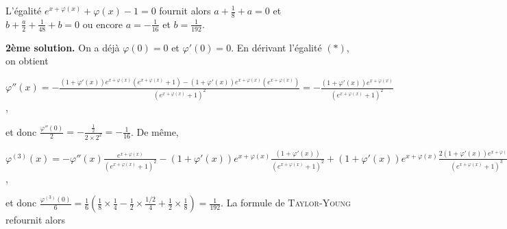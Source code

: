 {{L'égalité $e^{x+\varphi(x)}+\varphi(x)-1=0$ fournit alors $a+ \frac{1}{8}+a=0$ et $b+ \frac{a}{2}+ \frac{1}{48}+b=0$ ou encore $a=- \frac{1}{16}$ et $b= \frac{1}{192}$.

\textbf{2ème solution.} On a déjà $\varphi(0)=0$ et $\varphi'(0)=0$. En dérivant l'égalité $(*)$, on obtient

\begin{center}
$\varphi''(x)=- \frac{(1+\varphi'(x))e^{x+\varphi(x)}(e^{x+\varphi(x)}+1)-(1+\varphi'(x))e^{x+\varphi(x)}(e^{x+\varphi(x)})}{\left(e^{x+\varphi(x)}+1\right)^2}=- \frac{(1+\varphi'(x))e^{x+\varphi(x)}}{\left(e^{x+\varphi(x)}+1\right)^2}$,
\end{center}

et donc $ \frac{\varphi''(0)}{2}=- \frac{ \frac{1}{2}}{2\times2^2}=- \frac{1}{16}$. De même,

\begin{center}
$\varphi^{(3)}(x)=-\varphi''(x) \frac{e^{x+\varphi(x)}}{\left(e^{x+\varphi(x)}+1\right)^2}-(1+\varphi'(x))e^{x+\varphi(x)} \frac{(1+\varphi'(x))}{\left(e^{x+\varphi(x)}+1\right)^2}+(1+\varphi'(x))e^{x+\varphi(x)} \frac{2(1+\varphi'(x))e^{x+\varphi(x)}}{\left(e^{x+\varphi(x)}+1\right)^3}$,
\end{center}

et donc $ \frac{\varphi^{(3)}(0)}{6}= \frac{1}{6}\left( \frac{1}{8}\times \frac{1}{4}- \frac{1}{2}\times \frac{1/2}{4}+ \frac{1}{2}\times \frac{1}{8}\right)= \frac{1}{192}$. La formule de \textsc{Taylor}-\textsc{Young} refournit alors

\begin{center}
\end{center}
}
}
